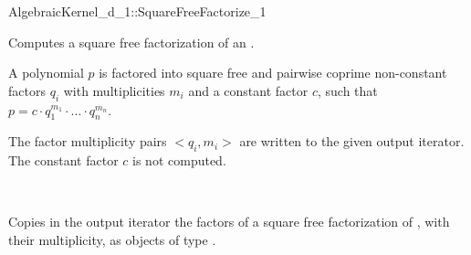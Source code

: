 \begin{ccRefFunctionObjectConcept}{AlgebraicKernel_d_1::SquareFreeFactorize_1}

\ccDefinition
Computes a square free factorization of an
.

A polynomial $p$ is factored into square free and pairwise 
coprime non-constant factors $q_i$ with multiplicities $m_i$ 
and a constant factor $c$, such that 
$p = c  \cdot  q_1^{m_1}  \cdot  ...  \cdot  q_n^{m_n}$.

The factor multiplicity pairs $<q_i,m_i>$ are written to the 
given output iterator. The constant factor $c$ is not computed. 

\ccRefines 
{}\\

\ccOperations
{}

{Copies in the output iterator the factors of a square free 
factorization of , with their multiplicity, as objects of type 
.}

\ccSeeAlso
{}\\
\\

\end{ccRefFunctionObjectConcept}
